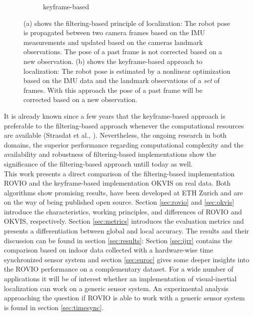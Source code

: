 \begin{figure}
\begin{subfigure}[b]{0.4\textwidth}
    \caption{keyframe-based}
    \label{fig:2}
  \end{subfigure}
\caption{(a) shows the filtering-based principle of localization: The robot pose is propagated between two camera frames based on the IMU measurements and updated based on the cameras landmark observations. The pose of a past frame is not corrected based on a new observation. (b) shows the keyframe-based approach to localization: The robot pose is estimated by a nonlinear optimization based on the IMU data and the landmark observations of a \textit{set} of frames. With this approach the pose of a past frame will be corrected based on a new observation.}
\label{pics:filtering_keyframe}
\end{figure}

It is already known since a few years that the keyframe-based approach is preferable to the filtering-based approach whenever the computational resources are available (Strasdat et al., \cite{strasdat2010real}). Nevertheless, the ongoing research in both domains, the superior performance regarding computational complexity and the availability and robustness of filtering-based implementations show the significance of the filtering-based approach untill today as well. \\

This work presents a direct comparison of the filtering-based implementation ROVIO and the keyframe-based implementation OKVIS on real data. Both algorithms show promising results, have been developed at ETH Zurich and are on the way of being published open source. Section \ref{sec:rovio} and \ref{sec:okvis} introduce the characteristics, working principles, and differences of ROVIO and OKVIS, respectively. Section \ref{sec:metrics} introduces the evaluation metrics and presents a differentiation between global and local accuracy. The results and their discussion can be found in section \ref{sec:results}: Section \ref{sec:ijrr} contains the comparison based on indoor data collected with a hardware-wise time synchronized sensor system and section \ref{sec:euroc} gives some deeper insights into the ROVIO performance on a complementary dataset. For a wide number of applications it will be of interest whether an implementation of visual-inertial localization can work on a generic sensor system. An experimental analysis approaching the question if ROVIO is able to work with a generic sensor system is found in section \ref{sec:timesync}. \\
